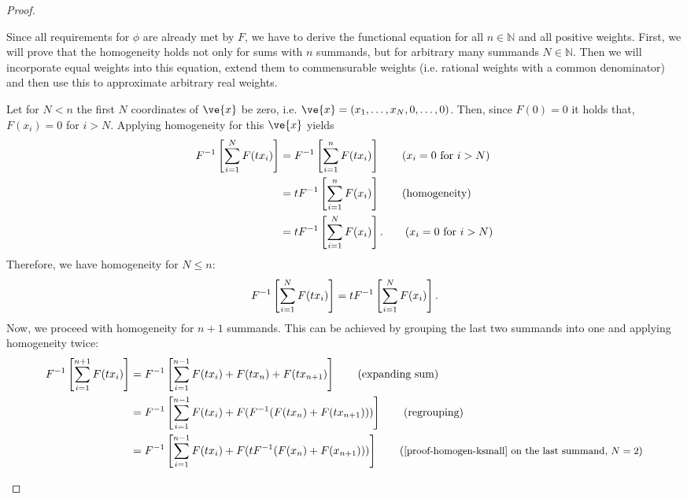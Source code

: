 \begin{proof}
\begin{proofpart}
		Since all requirements for $\phi$ are already met by $F$, we have to derive the functional equation for all $n \in \mathbb{N}$ and all positive weights. First, we will prove that the homogeneity holds not only for sums with $n$ summands, but for arbitrary many summands $N \in \mathbb{N}$. Then we will incorporate equal weights into this equation, extend them to commensurable weights (i.e. rational weights with a common denominator) and then use this to approximate arbitrary real weights.

		\begin{proofpp}
			Let for $N < n$ the first $N$ coordinates of $\ve{x}$ be zero, i.e. $\ve{x} = (\ta_1, \dots, \ta_N, 0, \dots , 0)$. Then, since $F(0) = 0$ it holds that, $F(x_i) = 0$ for $i > N$. Applying homogeneity for this $\ve{x}$ yields
			\begin{align}
				F^{-1} \left[ \sum_{i=1}^{N} F(t x_i) \right] &= F^{-1} \left[ \sum_{i=1}^{n} F(t x_i) \right] \tag{$x_i = 0$ for $i > N$}  \\
				                                                &= t F^{-1} \left[ \sum_{i=1}^{n} F(x_i) \right] \tag{homogeneity}            \\
				                                                &= t F^{-1} \left[ \sum_{i=1}^{N} F(x_i) \right]. \tag{$x_i = 0$ for $i > N$}
			\end{align}
			Therefore, we have homogeneity for $N \leq n$:
			\begin{equation} \label{proof-homogen-ksmall}
				F^{-1} \left[ \sum_{i=1}^{N} F(t x_i) \right] = t F^{-1} \left[ \sum_{i=1}^{N} F(x_i) \right].
			\end{equation}
			Now, we proceed with homogeneity for $n+1$ summands. This can be achieved by grouping the last two summands into one and applying homogeneity twice:
			\begin{align*}
				F^{-1} \left[ \sum_{i=1}^{n+1} F(t\ta_i) \right] & = F^{-1} \left[ \sum_{i=1}^{n-1} F(t\ta_i) + F(t\ta_{n}) + F(t\ta_{n+1}) \right]      \tag{expanding sum}                                                             \\
				                                                 & = F^{-1} \left[ \sum_{i=1}^{n-1} F(t\ta_i) + F (F^{-1} ( F(t\ta_{n}) + F(t\ta_{n+1}) )) \right] \tag{regrouping}                                                      \\
				                                                 & =  F^{-1} \left[ \sum_{i=1}^{n-1} F(t\ta_i) + F (t F^{-1} ( F(\ta_{n}) + F(\ta_{n+1}) )) \right] \tag{\small{\cref{proof-homogen-ksmall} on the last summand, $N=2$}} \\

\end{align*}
\end{proofpp}
\end{proofpart}
\end{proof}
